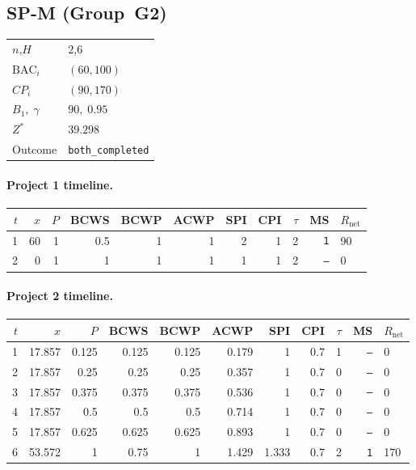 \documentclass[12pt, a4paper]{article}
\newcommand{\BAC}{\mathrm{BAC}}
\begin{document}
\newpage

\subsection*{SP-M  (Group~G2)}
\begin{center}
\begin{tabular}{ll}
\toprule
$n$,\;$H$ & $2$,\;$6$ \\
$\BAC_i$ & $(60, 100)$ \\
$CP_i$   & $(90, 170)$ \\
$B_1,\;\gamma$ & $90,\;0.95$ \\
$Z^*$ & $39.298$ \\
Outcome & \texttt{both_completed} \\
\bottomrule
\end{tabular}
\end{center}

\paragraph{Project 1 timeline.}
\begin{center}
\begin{tabular}{rrrrrrrrrrl}
\toprule
$t$ & $x$ & $P$ & BCWS & BCWP & ACWP & SPI & CPI & $\tau$ & MS & $R_{\mathrm{net}}$\\
\midrule
1 & 60 & 1 & 0.5 & 1 & 1 & 2 & 1 & 2 & \texttt{1} & 90 \\
2 & 0 & 1 & 1 & 1 & 1 & 1 & 1 & 2 & \texttt{---} & 0 \\
\bottomrule
\end{tabular}
\end{center}
\paragraph{Project 2 timeline.}
\begin{center}
\begin{tabular}{rrrrrrrrrrl}
\toprule
$t$ & $x$ & $P$ & BCWS & BCWP & ACWP & SPI & CPI & $\tau$ & MS & $R_{\mathrm{net}}$\\
\midrule
1 & 17.857 & 0.125 & 0.125 & 0.125 & 0.179 & 1 & 0.7 & 1 & \texttt{---} & 0 \\
2 & 17.857 & 0.25 & 0.25 & 0.25 & 0.357 & 1 & 0.7 & 0 & \texttt{---} & 0 \\
3 & 17.857 & 0.375 & 0.375 & 0.375 & 0.536 & 1 & 0.7 & 0 & \texttt{---} & 0 \\
4 & 17.857 & 0.5 & 0.5 & 0.5 & 0.714 & 1 & 0.7 & 0 & \texttt{---} & 0 \\
5 & 17.857 & 0.625 & 0.625 & 0.625 & 0.893 & 1 & 0.7 & 0 & \texttt{---} & 0 \\
6 & 53.572 & 1 & 0.75 & 1 & 1.429 & 1.333 & 0.7 & 2 & \texttt{1} & 170 \\
\bottomrule
\end{tabular}
\end{center}
\end{document}
